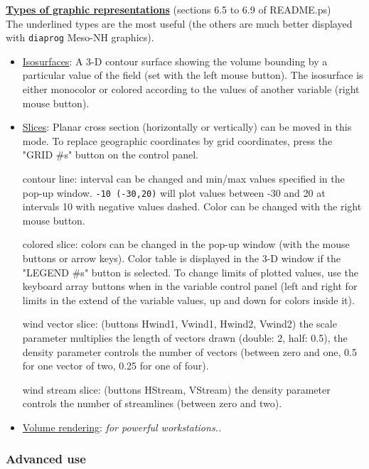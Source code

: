 \underline{\bf Types of graphic representations} \label{sss:graph}(sections 6.5 to 6.9 of README.ps) \\
The underlined types are the most useful (the others are much better displayed
with {\tt diaprog} Meso-NH graphics).
\begin{itemize}
\item\underline{\sf Isosurfaces}: 
 A 3-D contour surface showing the volume bounding by a particular value of the
field (set with the left mouse button). The isosurface is either monocolor
or colored according to the values of another variable (right mouse button). 

\item\underline{\sf Slices}: 
Planar cross section (horizontally or vertically) can be moved in this mode.
To replace geographic coordinates by grid
coordinates, press the {\sf "GRID \#s"} button on the control panel.

\subitem contour line: interval can be changed
and min/max values specified in the pop-up window. {\tt -10 (-30,20)} will
plot values between -30 and 20 at intervals 10 with negative values dashed.
Color can be changed with the right mouse button.

\subitem colored slice: colors can be changed in the pop-up window 
(with the mouse buttons or arrow keys). Color table is displayed in the
3-D window if the {\sf "LEGEND \#s"} button is selected. 
To change limits of plotted values, use the keyboard array buttons when in 
the variable control panel (left and right for limits in the extend of the 
variable values, up and down for colors inside it).

\subitem wind vector slice: (buttons {\sf Hwind1, Vwind1, Hwind2, Vwind2})
the scale parameter multiplies the length of vectors drawn
(double: 2, half: 0.5), the density parameter controls the number of vectors
(between zero and one, 0.5 for one vector of two, 0.25 for one of four).

\subitem wind stream slice: (buttons {\sf HStream, VStream})
the density parameter controls the number of streamlines
(between zero and two).

\item\underline{\sf Volume rendering}: {\it for powerful workstations..}
 
\end{itemize}


\subsubsection{Advanced use}


